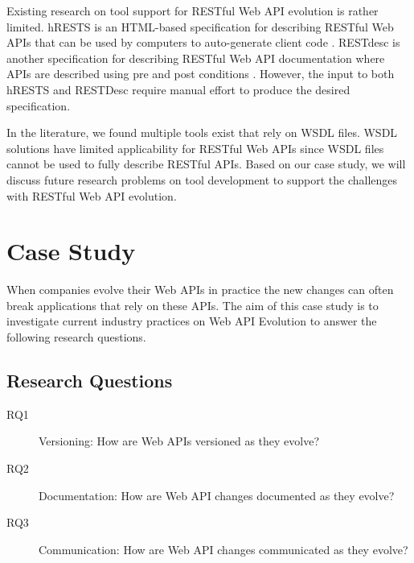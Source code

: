 Existing research on tool support for RESTful Web API evolution is rather limited. hRESTS is an HTML-based specification for describing RESTful Web APIs that can be used by computers to auto-generate client code \cite{4740521}. RESTdesc is another specification for describing RESTful Web API documentation where APIs are described using pre and post conditions \cite{RESTdesc}. However, the input to both hRESTS and RESTDesc require manual effort to produce the desired specification.

In the literature, we found multiple tools exist that rely on WSDL files. WSDL solutions have limited applicability for RESTful Web APIs since WSDL files cannot be used to fully describe RESTful APIs. Based on our case study, we will discuss future research problems on tool development to support the challenges with RESTful Web API evolution.

\section{Case Study}
When companies evolve their Web APIs in practice the new changes can often break applications that rely on these APIs. The aim of this case study is to investigate current industry practices on Web API Evolution to answer the following research questions.

\subsection{Research Questions} %

\begin{description}
  \item[RQ1] Versioning: How are Web APIs versioned as they evolve?
  \item[RQ2] Documentation: How are Web API changes documented as they evolve?
  \item[RQ3] Communication: How are Web API changes communicated as they evolve?
\end{description}

